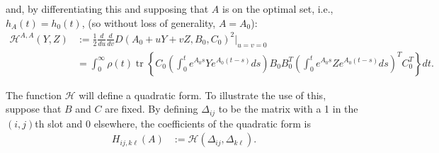 \documentclass{article}
\newcommand{\tr}{\mathop{\mbox{tr}}} %
\newcommand{\calH}{\mathcal{H}}
\newcommand{\1}{\mathbbm{1}}
\begin{document}
and, by differentiating this and supposing that $A$ is on the optimal set,
i.e., $h_A(t)=h_0(t)$, (so without loss of generality, $A=A_0$):
\begin{equation}
  \begin{aligned}
      \calH^{A,A}(Y,Z) 
      &:= 
      \frac{1}{2} \frac{d}{du} \frac{d}{dv} D(A_0+uY+vZ,B_0,C_0)^2 \vert_{u=v=0} \\
      &=
        \int_0^\infty \rho(t) \tr\left\{ C_0 
        \left( \int_0^t e^{A_0 s} Y e^{A_0 (t-s)} ds \right) 
        B_0 B_0^T 
        \left( \int_0^t e^{A_0 s} Z e^{A_0 (t-s)} ds \right)^T
        C_0^T \right\} dt  .
  \end{aligned}
\end{equation}

The function $\calH$ will define a quadratic form.
To illustrate the use of this, suppose that $B$ and $C$ are fixed.
By defining $\Delta_{ij}$ to be the matrix with a 1 in the $(i,j)$th slot
and 0 elsewhere,
the coefficients of the quadratic form is
\begin{equation}
    \begin{aligned}
        H_{ij, k\ell}(A)
        &:=
        \calH(\Delta_{ij}, \Delta_{k\ell}) .
    \end{aligned}
\end{equation}
\end{document}
